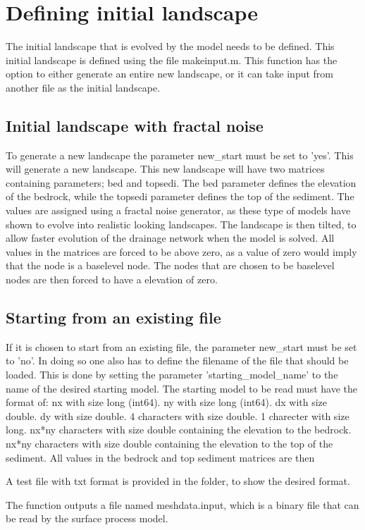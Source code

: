 \documentclass[a4paper,12pt,oneside,article,]{memoir}
\begin{document}
\section{Defining initial landscape}
The initial landscape that is evolved by the model needs to be defined. This initial landscape is defined using the file makeinput.m. This function has the option to either generate an entire new landscape, or it can take input from another file as the initial landscape.
\subsection{Initial landscape with fractal noise}
To generate a new landscape the parameter new\_start must be set to 'yes'. This will generate a new landscape. This new landscape will have two matrices containing parameters; bed and topsedi. The bed parameter defines the elevation of the bedrock, while the topsedi parameter defines the top of the sediment. The values are assigned using a fractal noise generator, as these type of models have shown to evolve into realistic looking landscapes. The landscape is then tilted, to allow faster evolution of the drainage network when the model is solved. All values in the matrices are forced to be above zero, as a value of zero would imply that the node is a baselevel node. The nodes that are chosen to be baselevel nodes are then forced to have a elevation of zero.
\subsection{Starting from an existing file}
If it is chosen to start from an existing file, the parameter new\_start must be set to 'no'. In doing so one also has to define the filename of the file that should be loaded. This is done by setting the parameter 'starting\_model\_name' to the name of the desired starting model. The starting model to be read must have the format of:
nx with size long (int64).
ny with size long (int64).
dx with size double.
dy with size double.
4 characters with size double.
1 charecter with size long.
nx*ny characters with size double containing the elevation to the bedrock.
nx*ny characters with size double containing the elevation to the top of the sediment.
All values in the bedrock and top sediment matrices are then 

A test file with txt format is provided in the folder, to show the desired format.

The function outputs a file named meshdata.input, which is a binary file that can be read by the surface process model. 
\end{document}
